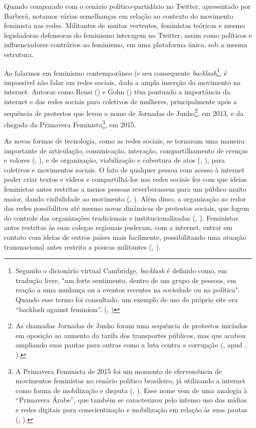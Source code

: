 \documentclass[
	12pt,				%
	openright,			%
	twoside,			%
	a4paper,			%
	english,			%
	brazil				%
	]{abntex2}
\begin{document}
 Quando comparado com o cenário político-partidário no Twitter, apresentado por Barberá, notamos várias semelhanças em relação ao contexto do movimento feminista nas redes. Militantes de muitas vertentes, feministas teóricas e mesmo legisladoras defensoras do feminismo interagem no Twitter, assim como políticos e influenciadores contrários ao feminismo, em uma plataforma única, sob a mesma estrutura. 

 Ao falarmos em feminismo contemporâneo (e seu consequente \emph{backlash}\footnote{Segundo o dicionário virtual Cambridge, \textit{backlash} é definido como, em tradução livre, "um forte sentimento, dentro de um grupo de pessoas, em reação a uma mudança ou a eventos recentes na sociedade ou na política". Quando esse termo foi consultado, um exemplo de uso do próprio site era “backlash against feminism”. (, \citeyear{backlash2020})}, é impossível não falar em redes sociais, dada a ampla inserção do movimento na internet. Autoras como Rensi (\citeyear{rensi2017}) e Gohn (\citeyear{gohn2016}) têm pontuado a importância da internet e das redes sociais para coletivos de mulheres, principalmente após a sequência de protestos que levou o nome de Jornadas de Junho\footnote{As chamadas Jornadas de Junho foram uma sequência de protestos iniciados em oposição ao aumento da tarifa dos transportes públicos, mas que acabou ampliando suas pautas para outras como a luta contra a corrupção (, \citeyear{melito2014} apud , \citeyear{rensi2017}).}, em 2013, e da chegada da Primavera Feminista\footnote{A Primavera Feminista de 2015 foi um momento de efervescência de movimentos feministas no cenário político brasileiro, já utilizando a internet como forma de mobilização e disputa (, \citeyear{rensi2017}). Esse nome vem de uma analogia à “Primavera Árabe”, que também se caracterizou pelo intenso uso das mídias e redes digitais para conscientização e mobilização em relação às suas pautas (, \citeyear{martinez2019}).}, em 2015.
 
 As novas formas de tecnologia, como as redes sociais, se tornaram uma maneira importante de articulação, comunicação, interação, compartilhamento de crenças e valores (, \citeyear{gohn2016}), e de organização, viabilização e cobertura de atos (, \citeyear{araujo2018}), para coletivos e movimentos sociais. O fato de qualquer pessoa com acesso à internet poder criar textos e vídeos e compartilhá-los nas redes sociais fez com que ideias feministas antes restritas a menos pessoas reverberassem para um público muito maior, dando visibilidade ao movimento (, \citeyear{perez2019}). Além disso, a organização ao redor das redes possibilitou até mesmo novas dinâmicas de protestos sociais, que fogem do controle das organizações tradicionais e institucionalizadas (, \citeyear{gohn2016}). Feministas antes restritas às suas colegas regionais puderam, com a internet, entrar em contato com ideias de outros países mais facilmente, possibilitando uma atuação transnacional antes restrita a poucas militantes (, \citeyear{perez2019}). 
\end{document}
